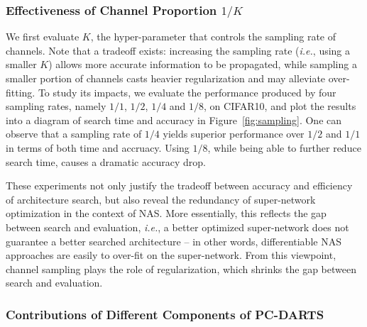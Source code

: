 \documentclass{article} \usepackage{iclr2020_conference,times}
\begin{document}
\subsubsection{Effectiveness of Channel Proportion $1/K$}
\label{Experiments:Ablation:Sampling}

We first evaluate $K$, the hyper-parameter that controls the sampling rate of channels. Note that a tradeoff exists: increasing the sampling rate (\textit{i.e.}, using a smaller $K$) allows more accurate information to be propagated, while sampling a smaller portion of channels casts heavier regularization and may alleviate over-fitting. To study its impacts, we evaluate the performance produced by four sampling rates, namely $1/1$, $1/2$, $1/4$ and $1/8$, on CIFAR10, and plot the results into a diagram of search time and accuracy in Figure~\ref{fig:sampling}. One can observe that a sampling rate of $1/4$ yields superior performance over $1/2$ and $1/1$ in terms of both time and accruacy. Using $1/8$, while being able to further reduce search time, causes a dramatic accuracy drop.

These experiments not only justify the tradeoff between accuracy and efficiency of architecture search, but also reveal the redundancy of super-network optimization in the context of NAS. More essentially, this reflects the gap between search and evaluation, \textit{i.e.}, a better optimized super-network does not guarantee a better searched architecture -- in other words, differentiable NAS approaches are easily to over-fit on the super-network. From this viewpoint, channel sampling plays the role of regularization, which shrinks the gap between search and evaluation.



\subsubsection{Contributions of Different Components of PC-DARTS}
\label{Experiments:Ablation:Components}
\end{document}
